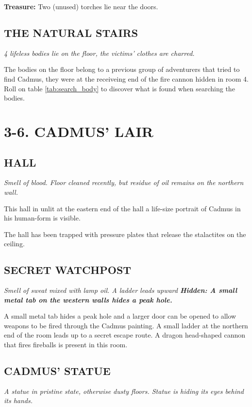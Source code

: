 \documentclass[letterpaper,sansserif,tightsqueeze]{rpg-module}
\begin{document}
\textbf{Treasure:} Two (unused) torches lie near the doors.

\subsection{THE NATURAL STAIRS}
\textit{4 lifeless bodies lie on the floor, the victims' clothes are charred.}

The bodies on the floor belong to a previous group of adventurers that tried to find Cadmus, they were at the receiveing end of the fire cannon hidden in room 4. Roll on table \ref{tab:search_body} to discover what is found when searching the bodies.

\section{3-6. CADMUS' LAIR}

\setcounter{subsection}{2}

\subsection{HALL}
\textit{Smell of blood. Floor cleaned recently, but residue of oil remains on the northern wall.}

This hall in unlit at the eastern end of the hall a life-size portrait of Cadmus in his human-form is visible.

The hall has been trapped with pressure plates that release the stalactites on the ceiling.

\subsection{SECRET WATCHPOST}
\textit{Smell of sweat mixed with lamp oil. A ladder leads upward \textbf{Hidden: A small metal tab on the western walls hides a peak hole.}}

A small metal tab hides a peak hole and a larger door can be opened to allow weapons to be fired through the Cadmus painting. A small ladder at the northern end of the room leads up to a secret escape route. A dragon head-shaped cannon that fires fireballs is present in this room.

\subsection{CADMUS' STATUE}
\textit{A statue in pristine state, otherwise dusty floors. Statue is hiding its eyes behind its hands.}
\end{document}
